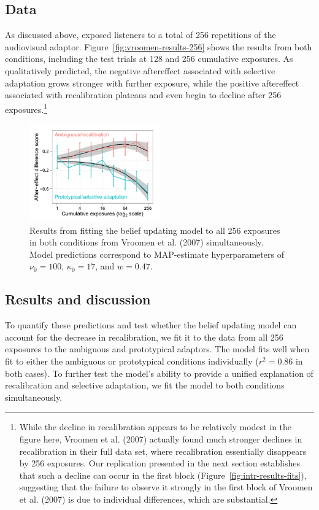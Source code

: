 \subsection{Data}
As discussed above, \textcite{Vroomen2007} exposed listeners to a total of 256 repetitions of the audiovisual adaptor.  Figure~\ref{fig:vroomen-results-256} shows the results from both conditions, including the test trials at 128 and 256 cumulative exposures.  As qualitatively predicted, the negative aftereffect associated with selective adaptation grows stronger with further exposure, while the positive aftereffect associated with recalibration plateaus and even begin to decline after 256 exposures.\footnote{While the decline in recalibration appears to be relatively modest in the figure here, Vroomen et al. (2007) actually found much stronger declines in recalibration in their full data set, where recalibration essentially disappears by 256 exposures.  Our replication presented in the next section establishes that such a decline can occur in the first block (Figure~\ref{fig:intr-results-fits}), suggesting that the failure to observe it strongly in the first block of Vroomen et al. (2007) is due to individual differences, which are substantial.}

\begin{figure}[htb]
  \centering
  \includegraphics[width=0.5\textwidth]{vroomen-preds-firstblock.pdf}
  \caption{Results from fitting the belief updating model to all 256 exposures in both conditions from Vroomen et al. (2007) simultaneously.  Model predictions correspond to MAP-estimate hyperparameters of $\nu_0 = 100$, $\kappa_0=17$, and $w=0.47$.}
  \label{fig:model-fits-vroomen-256-simult}
\end{figure}

\subsection{Results and discussion}
To quantify these predictions and test whether the belief updating model can account for the decrease in recalibration, we fit it to the data from all 256 exposures to the ambiguous and prototypical adaptors.
The model fits well when fit to either the ambiguous or prototypical conditions individually ($r^2=0.86$ in both cases). To further test the model's ability to provide a unified explanation of recalibration and selective adaptation, we fit the model to both conditions simultaneously.

